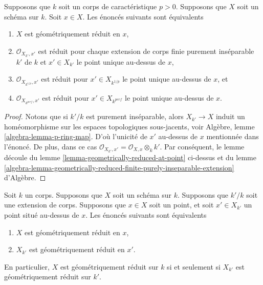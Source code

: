 \begin{lemma}
\label{lemma-check-only-finite-inseparable-extensions}
Supposons que $k$ soit un corps de caractéristique $p > 0$. Supposons que $X$
soit un schéma sur $k$. Soit $x \in X$. Les énoncés suivants sont équivalents
\begin{enumerate}
\item $X$ est géométriquement réduit en $x$, \item
$\mathcal{O}_{X_{k'}, x'}$ est réduit pour chaque
extension de corps finie purement inséparable $k'$ de
$k$ et $x' \in X_{k'}$ le point unique au-dessus de $x$,
\item $\mathcal{O}_{X_{k^{1/p}}, x'}$ est réduit pour
$x' \in X_{k^{1/p}}$ le point unique au-dessus de $x$,
et \item $\mathcal{O}_{X_{k^{perf}}, x'}$ est réduit pour
$x' \in X_{k^{perf}}$ le point unique au-dessus de $x$.
\end{enumerate}
\end{lemma}

\begin{proof}
Notons que si $k'/k$ est purement inséparable, alors $X_{k'}
\to X$ induit un homéomorphisme sur les espaces
topologiques sous-jacents, voir Algèbre, lemme
\ref{algebra-lemma-p-ring-map}. D'où l'unicité de $x'$
au-dessus de $x$ mentionnée dans l'énoncé. De plus, dans ce cas
$\mathcal{O}_{X_{k'}, x'} = \mathcal{O}_{X, x} \otimes_k k'$.
Par conséquent, le lemme découle du lemme
\ref{lemma-geometrically-reduced-at-point} ci-dessus et du lemme
\ref{algebra-lemma-geometrically-reduced-finite-purely-inseparable-extension} d'Algèbre.
\end{proof}

\begin{lemma}
\label{lemma-geometrically-reduced-upstairs}
Soit $k$ un corps. Supposons que $X$
soit un schéma sur $k$. Supposons que $k'/k$ soit
une extension de corps. Supposons que $x \in X$ soit
un point, et soit $x' \in X_{k'}$ un point situé
au-dessus de $x$. Les énoncés suivants sont équivalents
\begin{enumerate}
\item $X$ est géométriquement réduit en $x$,
\item $X_{k'}$ est géométriquement réduit en $x'$.
\end{enumerate}
En particulier, $X$ est géométriquement réduit sur $k$ si et
seulement si $X_{k'}$ est géométriquement réduit sur $k'$.
\end{lemma}

